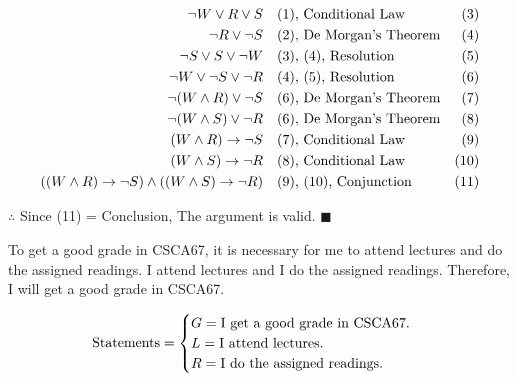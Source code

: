 \documentclass[]{article}
\begin{document}
\begin{center}
     \\
    \\
\end{center}
\begin{align*}
    \neg W \lor R \lor S \quad & \text{(1), Conditional Law} \hfill & \text{(3)} \\
    \neg R \lor \neg S \quad & \text{(2), De Morgan's Theorem} \hfill & \text{(4)} \\
    \neg S \lor S \lor \neg W \quad & \text{(3), (4), Resolution} \hfill & \text{(5)} \\
    \neg W \lor \neg S \lor \neg R \quad & \text{(4), (5), Resolution} \hfill & \text{(6)} \\
    \neg (W \land R) \lor \neg S \quad & \text{(6), De Morgan's Theorem} \hfill & \text{(7)} \\
    \neg (W \land S) \lor \neg R \quad & \text{(6), De Morgan's Theorem} \hfill & \text{(8)} \\
    (W \land R) \rightarrow \neg S \quad & \text{(7), Conditional Law} \hfill & \text{(9)} \\
    (W \land S) \rightarrow \neg R \quad & \text{(8), Conditional Law} \hfill & \text{(10)} \\
    ((W \land R) \rightarrow \neg S) \land ((W \land S) \rightarrow \neg R) \quad & \text{(9), (10), Conjunction} \hfill & \text{(11)} \\
\end{align*}
\begin{center}
    $\therefore$ Since (11) = Conclusion, The argument is valid. $\blacksquare$
\end{center}

\begin{question}
    To get a good grade in CSCA67, it is necessary for me to attend lectures and do the assigned readings. I attend
lectures and I do the assigned readings. Therefore, I will get a good grade in CSCA67.
\end{question}
\[
    \text{Statements} = \begin{cases}
        G = \text{I get a good grade in CSCA67.} \\         
        L = \text{I attend lectures.} \\
        R = \text{I do the assigned readings.}
    \end{cases} \\
\]
    
\end{document}
